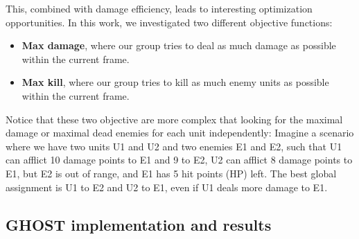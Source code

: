 \documentclass[journal]{IEEEtran}
\newcommand{\ghost}{\textsc{GHOST}\xspace}
\begin{document}
This,   combined  with   damage  efficiency,   leads  to   interesting
optimization  opportunities.   In  this  work,  we   investigated  two
different objective functions:
\begin{itemize}
\item {\bf Max  damage}, where our group tries to  deal as much damage
  as possible within the current frame.
\item {\bf  Max kill},  where our  group tries to  kill as  much enemy
  units as possible within the current frame.
\end{itemize}
Notice that these two objective are  more complex that looking for the
maximal damage  or maximal dead  enemies for each  unit independently:
Imagine a scenario where  we have two units U1 and  U2 and two enemies
E1 and E2,  such that U1 can afflict  10 damage points to E1  and 9 to
E2, U2 can afflict 8 damage points to  E1, but E2 is out of range, and
E1 has 5 hit points (HP) left.  The best global assignment is U1 to E2
and U2 to E1, even if U1 deals more damage to E1.

\subsection{\ghost implementation and results}
\end{document}

